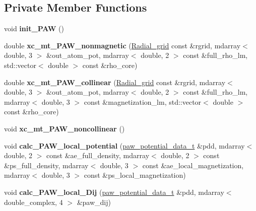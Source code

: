\subsection*{Private Member Functions}
\begin{DoxyCompactItemize}
\item 
\hypertarget{classsirius_1_1_potential_a3c711c33b95fff9172c892d7dcc680fc}{}void {\bfseries init\+\_\+\+P\+A\+W} ()\label{classsirius_1_1_potential_a3c711c33b95fff9172c892d7dcc680fc}

\item 
\hypertarget{classsirius_1_1_potential_a9037f4eb265f5115b23e53b8ee3c6998}{}double {\bfseries xc\+\_\+mt\+\_\+\+P\+A\+W\+\_\+nonmagnetic} (\hyperlink{classsirius_1_1_radial__grid}{Radial\+\_\+grid} const \&rgrid, mdarray$<$ double, 3 $>$ \&out\+\_\+atom\+\_\+pot, mdarray$<$ double, 2 $>$ const \&full\+\_\+rho\+\_\+lm, std\+::vector$<$ double $>$ const \&rho\+\_\+core)\label{classsirius_1_1_potential_a9037f4eb265f5115b23e53b8ee3c6998}

\item 
\hypertarget{classsirius_1_1_potential_a795a3b0d958beaa647dc365314fbe87a}{}double {\bfseries xc\+\_\+mt\+\_\+\+P\+A\+W\+\_\+collinear} (\hyperlink{classsirius_1_1_radial__grid}{Radial\+\_\+grid} const \&rgrid, mdarray$<$ double, 3 $>$ \&out\+\_\+atom\+\_\+pot, mdarray$<$ double, 2 $>$ const \&full\+\_\+rho\+\_\+lm, mdarray$<$ double, 3 $>$ const \&magnetization\+\_\+lm, std\+::vector$<$ double $>$ const \&rho\+\_\+core)\label{classsirius_1_1_potential_a795a3b0d958beaa647dc365314fbe87a}

\item 
\hypertarget{classsirius_1_1_potential_a3620732074493dcebffd964f0584a355}{}void {\bfseries xc\+\_\+mt\+\_\+\+P\+A\+W\+\_\+noncollinear} ()\label{classsirius_1_1_potential_a3620732074493dcebffd964f0584a355}

\item 
\hypertarget{classsirius_1_1_potential_ab874e1a6d0498f8919647ddddb844596}{}void {\bfseries calc\+\_\+\+P\+A\+W\+\_\+local\+\_\+potential} (\hyperlink{structsirius_1_1_potential_1_1paw__potential__data__t}{paw\+\_\+potential\+\_\+data\+\_\+t} \&pdd, mdarray$<$ double, 2 $>$ const \&ae\+\_\+full\+\_\+density, mdarray$<$ double, 2 $>$ const \&ps\+\_\+full\+\_\+density, mdarray$<$ double, 3 $>$ const \&ae\+\_\+local\+\_\+magnetization, mdarray$<$ double, 3 $>$ const \&ps\+\_\+local\+\_\+magnetization)\label{classsirius_1_1_potential_ab874e1a6d0498f8919647ddddb844596}

\item 
\hypertarget{classsirius_1_1_potential_ae73d329c542ec894dd371ad3d4130aaf}{}void {\bfseries calc\+\_\+\+P\+A\+W\+\_\+local\+\_\+\+Dij} (\hyperlink{structsirius_1_1_potential_1_1paw__potential__data__t}{paw\+\_\+potential\+\_\+data\+\_\+t} \&pdd, mdarray$<$ double\+\_\+complex, 4 $>$ \&paw\+\_\+dij)\label{classsirius_1_1_potential_ae73d329c542ec894dd371ad3d4130aaf}


\end{DoxyCompactItemize}
